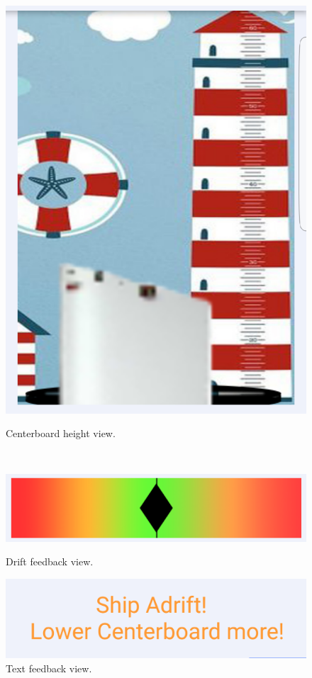 \begin{figure}[H]
	\centering
	\begin{minipage}[c]{0.35\textwidth}
	\includegraphics[width=\textwidth]{Figures/height.png}
	\caption{Centerboard height view.}
	\label{feedback-height}
	\end{minipage}
	~
	\begin{minipage}[c]{0.55\textwidth}
	\includegraphics[width=\textwidth]{Figures/drift.png}
	\caption{Drift feedback view.}
	\label{feedback-drift}
	
	\includegraphics[width=\textwidth]{Figures/text.png}
	\caption{Text feedback view.}
	\label{feedback-text}
	\end{minipage}
\end{figure}
